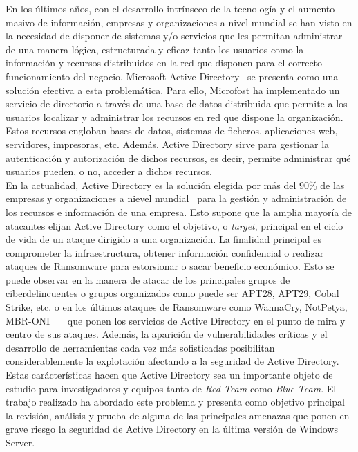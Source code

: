 En los últimos años, con el desarrollo intrínseco de la tecnología y el aumento masivo de información, empresas y organizaciones a nivel mundial se han visto en la necesidad de disponer de sistemas y/o servicios que les permitan administrar de una manera lógica, estructurada y eficaz tanto los usuarios como la información y recursos distribuidos en la red que disponen para el correcto funcionamiento del negocio. Microsoft Active Directory~\cite{Capitulo1:Microsoft} se presenta como una solución efectiva a esta problemática. Para ello, Microfost ha implementado un servicio de directorio a través de una base de datos distribuida que permite a los usuarios localizar y administrar los recursos en red que dispone la organización. Estos recursos engloban bases de datos, sistemas de ficheros, aplicaciones web, servidores, impresoras, etc. Además, Active Directory sirve para gestionar la autenticación y autorización de dichos recursos, es decir, permite administrar qué usuarios pueden, o no, acceder a dichos recursos.\\

En la actualidad, Active Directory es la solución elegida por más del 90\% de las empresas y organizaciones a nievel mundial~\cite{Capitulo1:Percent} para la gestión y administración de los recursos e información de una empresa. Esto supone que la amplia mayoría de atacantes elijan Active Directory como el objetivo, o {\it target}, principal en el ciclo de vida de un ataque dirigido a una organización. La finalidad principal es comprometer la infraestructura, obtener información confidencial o realizar ataques de Ransomware para estorsionar o sacar beneficio económico. Esto se puede observar en la manera de atacar de los principales grupos de ciberdelincuentes o grupos organizados como puede ser APT28, APT29, Cobal Strike, etc. o en los últimos ataques de Ransomware como WannaCry, NotPetya, MBR-ONI~\cite{Capitulo1:Ransomware}~\cite{Capitulo1:Ransomware2}~\cite{Capitulo1:Ransomware3} que ponen los servicios de Active Directory en el punto de mira y centro de sus ataques. Además, la aparición de vulnerabilidades críticas y el desarrollo de herramientas cada vez más sofisticadas posibilitan considerablemente la explotación afectando a la seguridad de Active Directory. \\

Estas carácterísticas hacen que Active Directory sea un importante objeto de estudio para investigadores y equipos tanto de {\it Red Team} como {\it Blue Team}. El trabajo realizado ha abordado este problema y presenta como objetivo principal la revisión, análisis y prueba de alguna de las principales amenazas que ponen en grave riesgo la seguridad de Active Directory en la última versión de Windows Server.\\


